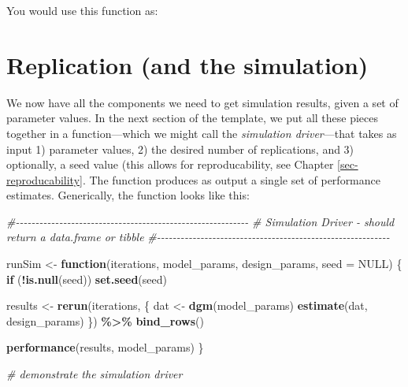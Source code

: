 \documentclass[
]{book}
\newenvironment{Shaded}{\begin{snugshade}}{\end{snugshade}}
\newcommand{\AttributeTok}[1]{\textcolor[rgb]{0.13,0.29,0.53}{#1}}
\newcommand{\CommentTok}[1]{\textcolor[rgb]{0.56,0.35,0.01}{\textit{#1}}}
\newcommand{\ConstantTok}[1]{\textcolor[rgb]{0.56,0.35,0.01}{#1}}
\newcommand{\ControlFlowTok}[1]{\textcolor[rgb]{0.13,0.29,0.53}{\textbf{#1}}}
\newcommand{\FunctionTok}[1]{\textcolor[rgb]{0.13,0.29,0.53}{\textbf{#1}}}
\newcommand{\NormalTok}[1]{#1}
\newcommand{\OtherTok}[1]{\textcolor[rgb]{0.56,0.35,0.01}{#1}}
\newcommand{\SpecialCharTok}[1]{\textcolor[rgb]{0.81,0.36,0.00}{\textbf{#1}}}
\begin{document}
You would use this function as:

\begin{Shaded}
\end{Shaded}

\section{Replication (and the simulation)}\label{replication-and-the-simulation}

We now have all the components we need to get simulation results, given a set of parameter values.
In the next section of the template, we put all these pieces together in a function---which we might call the \emph{simulation driver}---that takes as input 1) parameter values, 2) the desired number of replications, and 3) optionally, a seed value (this allows for reproducability, see Chapter \ref{sec-reproducability}. The function produces as output a single set of performance estimates. Generically, the function looks like this:

\begin{Shaded}
\begin{Highlighting}[]
\CommentTok{\#{-}{-}{-}{-}{-}{-}{-}{-}{-}{-}{-}{-}{-}{-}{-}{-}{-}{-}{-}{-}{-}{-}{-}{-}{-}{-}{-}{-}{-}{-}{-}{-}{-}{-}{-}{-}{-}{-}{-}{-}{-}{-}{-}{-}{-}{-}{-}{-}{-}{-}{-}{-}{-}{-}{-}{-}{-}{-}{-}}
\CommentTok{\# Simulation Driver {-} should return a data.frame or tibble}
\CommentTok{\#{-}{-}{-}{-}{-}{-}{-}{-}{-}{-}{-}{-}{-}{-}{-}{-}{-}{-}{-}{-}{-}{-}{-}{-}{-}{-}{-}{-}{-}{-}{-}{-}{-}{-}{-}{-}{-}{-}{-}{-}{-}{-}{-}{-}{-}{-}{-}{-}{-}{-}{-}{-}{-}{-}{-}{-}{-}{-}{-}}

\NormalTok{runSim }\OtherTok{\textless{}{-}} \ControlFlowTok{function}\NormalTok{(iterations, model\_params, design\_params, }\AttributeTok{seed =} \ConstantTok{NULL}\NormalTok{) \{}
  \ControlFlowTok{if}\NormalTok{ (}\SpecialCharTok{!}\FunctionTok{is.null}\NormalTok{(seed)) }\FunctionTok{set.seed}\NormalTok{(seed)}

\NormalTok{  results }\OtherTok{\textless{}{-}} \FunctionTok{rerun}\NormalTok{(iterations, \{}
\NormalTok{                dat }\OtherTok{\textless{}{-}} \FunctionTok{dgm}\NormalTok{(model\_params)}
                \FunctionTok{estimate}\NormalTok{(dat, design\_params)}
\NormalTok{              \}) }\SpecialCharTok{\%\textgreater{}\%}
    \FunctionTok{bind\_rows}\NormalTok{()}
  

  \FunctionTok{performance}\NormalTok{(results, model\_params)}
\NormalTok{\}}

\CommentTok{\# demonstrate the simulation driver}
\end{Highlighting}
\end{Shaded}
\end{document}

